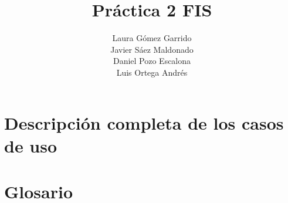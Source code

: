 \documentclass[10pt,a4paper,spanish]{report}
\title{\textbf{Práctica 2 FIS}}
\author{Laura Gómez Garrido\\
		Javier Sáez Maldonado\\
		Daniel Pozo Escalona\\
		Luis Ortega Andrés}
\begin{document}
\maketitle

\section*{Descripción completa de los casos de uso}

\centering


 \newpage
 \newpage
 \newpage
	\newpage
 \newpage
	\newpage
 \newpage
 \newpage
 \newpage
 \newpage
 \newpage
 \newpage
 \newpage
 \newpage
 \newpage
 \newpage
 \newpage
 \newpage
 \newpage
 \newpage
 \newpage
 \newpage
 \newpage
 \newpage
 \newpage
 \newpage
 \newpage
 \newpage
 \newpage
 \newpage
 \newpage
 \newpage
 \newpage
 \newpage
 \newpage
 \newpage
 \newpage
 \newpage
 \newpage
 \newpage
 \newpage
 \newpage
 \newpage
 \newpage
 \newpage
 \newpage
 \newpage
 \newpage
 \newpage
 \newpage
 \newpage


\newpage

\section*{Glosario}


\end{document}
